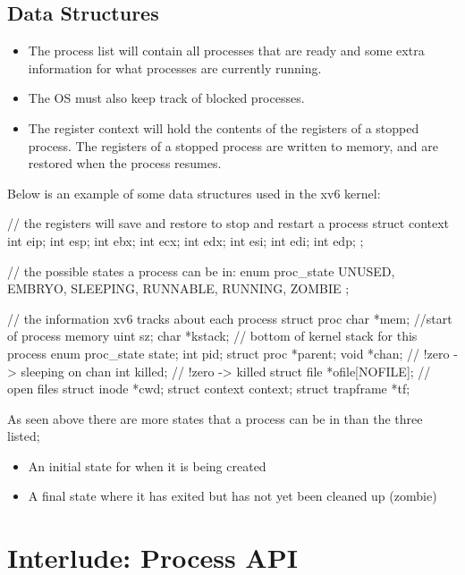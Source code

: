 \documentclass[11pt, a4paper]{article}
\theoremstyle{definition}
\theoremstyle{remark}
\newcommand{\chap}[2]{%
  \renewcommand{\thesection}{\arabic{section}}%
  \renewcommand{\theHsection}{chap.\arabic{section}}%
  \setcounter{section}{#1}\addtocounter{section}{-1}%
  \section{#2}}
\begin{document}
\subsection{Data Structures}
\begin{itemize}
  \item The process list will contain all processes that are ready and some extra information for what processes are currently running. 
  \item The OS must also keep track of blocked processes. 
  \item The register context will hold the contents of the registers of a stopped process. The registers of a stopped process are written to memory, and are restored when the process resumes. 
\end{itemize}
Below is an example of some data structures used in the xv6 kernel:
\newpage
\begin{ccode}
// the registers will save and restore to stop and restart a process 
struct context {
  int eip;
  int esp;
  int ebx;
  int ecx;
  int edx;
  int esi;
  int edi;
  int edp;
};

// the possible states a process can be in:
enum proc_state { UNUSED, EMBRYO, SLEEPING, RUNNABLE, RUNNING, ZOMBIE };

// the information xv6 tracks about each process 
struct proc {
  char *mem; //start of process memory
  uint sz;
  char *kstack; // bottom of kernel stack for this process
  enum proc_state state;
  int pid;
  struct proc *parent;
  void *chan; // !zero -> sleeping on chan 
  int killed; // !zero -> killed 
  struct file *ofile[NOFILE]; // open files 
  struct inode *cwd; 
  struct context context;
  struct trapframe *tf;
}
\end{ccode}
As seen above there are more states that a process can be in than the three listed; 
\begin{itemize}
  \item An initial state for when it is being created 
  \item A final state where it has exited but has not yet been cleaned up (zombie)
\end{itemize}
\newpage
\chap{5}{Interlude: Process API}
\end{document}

